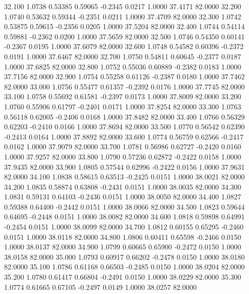   32.100   1.0738   0.53385   0.59065  -0.2345   0.0217   1.0000  37.4171  82.0000
  32.200   1.0740   0.53632   0.59344  -0.2351   0.0211   1.0000  37.4709  82.0000
  32.300   1.0742   0.53875   0.59615  -0.2356   0.0205   1.0000  37.5204  82.0000
  32.400   1.0744   0.54114   0.59881  -0.2362   0.0200   1.0000  37.5659  82.0000
  32.500   1.0746   0.54350   0.60141  -0.2367   0.0195   1.0000  37.6079  82.0000
  32.600   1.0748   0.54582   0.60396  -0.2372   0.0191   1.0000  37.6467  82.0000
  32.700   1.0750   0.54811   0.60645  -0.2377   0.0187   1.0000  37.6825  82.0000
  32.800   1.0752   0.55036   0.60889  -0.2382   0.0183   1.0000  37.7156  82.0000
  32.900   1.0754   0.55258   0.61126  -0.2387   0.0180   1.0000  37.7462  82.0000
  33.000   1.0756   0.55477   0.61357  -0.2392   0.0176   1.0000  37.7745  82.0000
  33.100   1.0758   0.55692   0.61581  -0.2397   0.0173   1.0000  37.8009  82.0000
  33.200   1.0760   0.55906   0.61797  -0.2401   0.0171   1.0000  37.8254  82.0000
  33.300   1.0763   0.56118   0.62005  -0.2406   0.0168   1.0000  37.8482  82.0000
  33.400   1.0766   0.56329   0.62203  -0.2410   0.0166   1.0000  37.8694  82.0000
  33.500   1.0770   0.56542   0.62390  -0.2413   0.0164   1.0000  37.8892  82.0000
  33.600   1.0774   0.56759   0.62566  -0.2417   0.0162   1.0000  37.9079  82.0000
  33.700   1.0781   0.56986   0.62727  -0.2420   0.0160   1.0000  37.9257  82.0000
  33.800   1.0790   0.57236   0.62872  -0.2422   0.0158   1.0000  37.9435  82.0000
  33.900   1.0805   0.57544   0.62996  -0.2422   0.0156   1.0000  37.9631  82.0000
  34.100   1.0838   0.58615   0.63513  -0.2425   0.0151   1.0000  38.0021  82.0000
  34.200   1.0835   0.58874   0.63808  -0.2431   0.0151   1.0000  38.0035  82.0000
  34.300   1.0831   0.59131   0.64103  -0.2436   0.0151   1.0000  38.0050  82.0000
  34.400   1.0827   0.59388   0.64400  -0.2442   0.0151   1.0000  38.0066  82.0000
  34.500   1.0823   0.59644   0.64695  -0.2448   0.0151   1.0000  38.0082  82.0000
  34.600   1.0818   0.59898   0.64991  -0.2454   0.0151   1.0000  38.0099  82.0000
  34.700   1.0812   0.60155   0.65295  -0.2460   0.0151   1.0000  38.0118  82.0000
  34.800   1.0806   0.60411   0.65598  -0.2466   0.0150   1.0000  38.0137  82.0000
  34.900   1.0799   0.60665   0.65900  -0.2472   0.0150   1.0000  38.0158  82.0000
  35.000   1.0793   0.60917   0.66202  -0.2478   0.0150   1.0000  38.0180  82.0000
  35.100   1.0786   0.61168   0.66503  -0.2485   0.0150   1.0000  38.0204  82.0000
  35.200   1.0780   0.61417   0.66804  -0.2491   0.0150   1.0000  38.0229  82.0000
  35.300   1.0774   0.61665   0.67105  -0.2497   0.0149   1.0000  38.0257  82.0000
